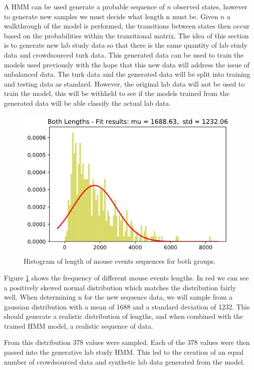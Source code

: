 \documentclass{article}
\begin{document}
A HMM can be used generate a probable sequence of $n$ observed states, however to generate new samples we must decide what length n must be.
Given $n$ a walkthrough of the model is performed, the transitions between states then occur based on the probabilities within the transitional matrix.
The idea of this section is to generate new lab study data so that there is the same quantity of lab study data and crowdsourced turk data.
This generated data can be used to train the models used previously with the hope that this new data will address the issue of unbalanced data.
The turk data and the generated data will be split into training and testing data as standard.
However, the original lab data will not be used to train the model, this will be withheld to see if the models trained from the generated data will be able classify the actual lab data.

\begin{figure}[ht]
    \centering
    \includegraphics[scale=0.5]{Images/Lengths-Histogram.png}
    \caption{Histogram of length of mouse events sequences for both groups.}
    \label{fig:normaldis}
\end{figure}

Figure \ref{fig:normaldis} shows the frequency of different mouse events lengths.
In red we can see a positively skewed normal distribution which matches the distribution fairly well.
When determining n for the new sequence data, we will sample from a gaussian distribution with a mean of 1688 and a standard deviation of 1232.
This should generate a realistic distribution of lengths, and when combined with the trained HMM model, a realistic sequence of data.

From this distribution 378 values were sampled.
Each of the 378 values were then passed into the generative lab study HMM.
This led to the creation of an equal number of crowdsourced data and synthetic lab data generated from the model.
\end{document}
